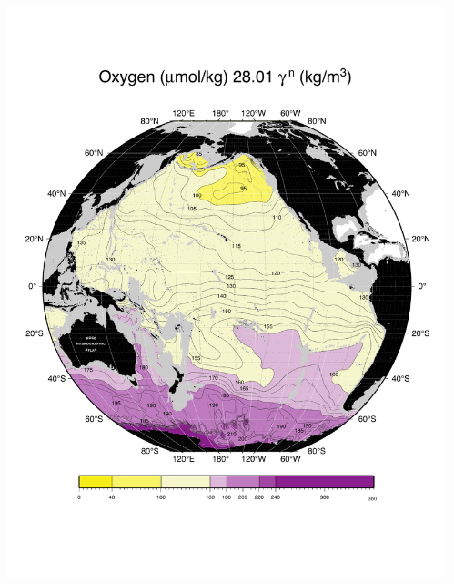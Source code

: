 \documentclass{beamer}
\begin{document}
\begin{frame}[plain,t]
\begin{columns}
\begin{column}{0.33\textwidth}
          \includegraphics[width=\textwidth]{oxygen_isopyc_final_pdf/pac2801_oxygen_final.pdf}  
      \end{column}
      \begin{column}{0.33\textwidth}

\end{column}
\end{columns}
\end{frame}
\end{document}
